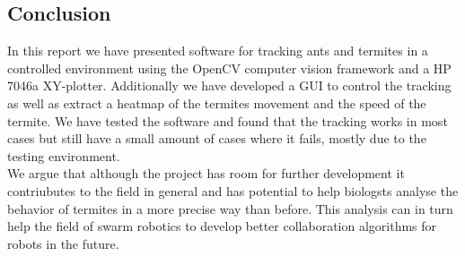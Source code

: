 
\subsection{Conclusion}

In this report we have presented software for tracking ants and termites in a controlled environment using the OpenCV computer vision framework and a HP 7046a XY-plotter. Additionally we have developed a GUI to control the tracking as well as extract a heatmap of the termites movement and the speed of the termite. We have tested the software and found that the tracking works in most cases but still have a small amount of cases where it fails, mostly due to the testing environment. \\

We argue that although the project has room for further development it contriubutes to the field in general and has potential to help biologsts analyse the behavior of termites in a more precise way than before. This analysis can in turn help the field of swarm robotics to develop better collaboration algorithms for robots in the future.

